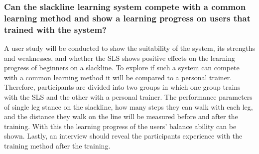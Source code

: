 \subsubsection{Can the slackline learning system compete with a common learning method and show a learning progress on users that trained with the system?}\label{rq_study}
A user study will be conducted to show the suitability of the system, its strengths and weaknesses, and whether the SLS shows positive effects on the learning progress of beginners on a slackline.
To explore if such a system can compete with a common learning method it will be compared to a personal trainer.
Therefore, participants are divided into two groups in which one group trains with the SLS and the other with a personal trainer.
The performance parameters of single leg stance on the slackline, how many steps they can walk with each leg, and the distance they walk on the line will be measured before and after the training.
With this the learning progress of the users' balance ability can be shown.
Lastly, an interview should reveal the participants experience with the training method after the training.



\begin{comment}
- Investigate related system

- Requirement analysis

- Conceptual design of an interactive feedback system for slacklining
-- Provide supportive feedback

- User interface design

- Integration

- Investigation of the system
\end{comment}
\begin{comment}

- Show if an interactive real time feedback system is usable for this kind of sport

- If the learning progress is comparable with other training methods like human trainer

- If such a system motivates user for slackline exercises
\end{comment}